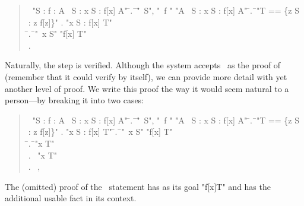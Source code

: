 \documentclass[a4paper]{easychair}
\begin{document}
\begin{quote} \small
  \begin{tabbing}
    \THEOREM\ "\forall S : \forall f \in [S -> \SUBSET\ S] : \exists A \in \SUBSET\ S : \forall x \in S : f[x] \neq A" \kill
    \PROOF \kill
    \LSP \= .\ \= \ASSUME \= "\NEW\ S", \kill
         \>        \>         \> "\NEW\ f \in [S -> \SUBSET\ S]" \kill
         \>        \> \PROVE "\exists A \in \SUBSET\ S : \forall x \in S : f[x] \neq A" \kill
         \>        \> \PROOF \kill
         \>   \hspace{1em} \= .\ \= \DEFINE "T == \{z \in S : z \notin f[z]\}" \kill
         \>        \> .  \> "\forall x \in S : f[x] \neq T" \\
         \>        \> \hspace{1em} \= .\ \= \ASSUME "\NEW\ x \in S" \PROVE "f[x] \neq T" \\
         \>        \>        \> .\ \> \QED \BY {}
  \end{tabbing}
\end{quote}
Naturally, the \QED step is verified.  Although the system accepts
\OBVIOUS\ as the proof of  (remember that it could verify  by
itself), we can provide more detail with yet another level
of proof.  We write this proof the way it would seem natural to a
person---by breaking it into two cases:
\begin{quote} \small
  \begin{tabbing}
    \THEOREM\ "\forall S : \forall f \in [S -> \SUBSET\ S] : \exists A \in \SUBSET\ S : \forall x \in S : f[x] \neq A" \kill
    \PROOF \kill
    \LSP \= .\ \= \ASSUME \= "\NEW\ S", \kill
         \>        \>         \> "\NEW\ f \in [S -> \SUBSET\ S]" \kill
         \>        \> \PROVE "\exists A \in \SUBSET\ S : \forall x \in S : f[x] \neq A" \kill
         \>        \> \PROOF \kill
         \> \hspace{1em} \= .\ \= \DEFINE "T == \{z \in S : z \notin f[z]\}" \kill
         \>        \> .  \> "\forall x \in S : f[x] \neq T" \kill
         \>        \>  \hspace{1em} \= .\ \= \ASSUME "\NEW\ x \in S" \PROVE "f[x] \neq T" \\
         \>        \>        \> \hspace{1em} \= .\ \= \CASE "x \in T" \\
         \>        \>        \>        \> .\ \> \CASE "x \notin T" \\
         \>        \>        \>        \> .\ \> \QED \BY {}, 
  \end{tabbing}
\end{quote}
The (omitted) proof of the \CASE\ statement  has as its goal
"f[x]\neq T" and has the additional usable fact  in its context.
\end{document}
